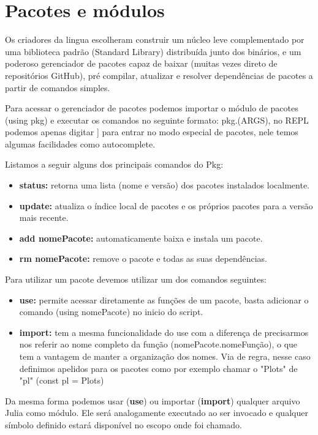 \section{Pacotes e módulos}

Os criadores da lingua escolheram construir um núcleo leve complementado por uma biblioteca padrão (Standard Library) distribuída junto dos binários, e um poderoso gerenciador de pacotes capaz de baixar (muitas vezes direto de repositórios GitHub), pré compilar, atualizar e resolver dependências de pacotes a partir de comandos simples. 

Para acessar o gerenciador de pacotes podemos importar o módulo de pacotes (using pkg) e executar os comandos no seguinte formato: pkg.(ARGS), no REPL podemos apenas digitar ] para entrar no modo especial de pacotes, nele temos algumas facilidades como autocomplete.

Listamos a seguir alguns dos principais comandos do Pkg:
\begin{itemize}
    \item \textbf{status:} retorna uma lista (nome e versão) dos pacotes instalados localmente.
    \item \textbf{update:} atualiza o índice local de pacotes e os próprios pacotes para a versão mais recente.
    \item \textbf{add nomePacote:} automaticamente baixa e instala um pacote.
    \item \textbf{rm nomePacote:} remove o pacote e todas as suas dependências.
\end{itemize}

Para utilizar um pacote devemos utilizar um dos comandos seguintes:
\begin{itemize}
    \item \textbf{use:} permite acessar diretamente as funções de um pacote, basta adicionar o comando (using nomePacote) no inicio do script. 
    \item \textbf{import:} tem a mesma funcionalidade do use com a diferença de precisarmos nos referir ao nome completo da função (nomePacote.nomeFunção), o que tem a vantagem de manter a organização dos nomes. Via de regra, nesse caso definimos apelidos para os pacotes como por exemplo chamar o "Plots" de "pl" (const pl = Plots) %
\end{itemize}

Da mesma forma podemos usar (\textbf{use}) ou importar (\textbf{import}) qualquer arquivo Julia como módulo. Ele será analogamente executado ao ser invocado e qualquer símbolo definido estará disponível no escopo onde foi chamado. 

